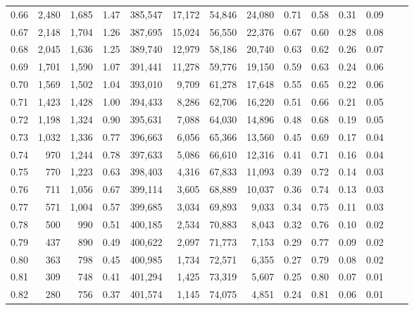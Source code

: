 \begin{tabular}{rrrrrrrrrrrrrr}
0.66 &   2,480 &  1,685 &    1.47 &  385,547 &   17,172 &  54,846 &  24,080 &  0.71 &  0.58 &  0.31 &      0.09 \\
0.67 &   2,148 &  1,704 &    1.26 &  387,695 &   15,024 &  56,550 &  22,376 &  0.67 &  0.60 &  0.28 &      0.08 \\
0.68 &   2,045 &  1,636 &    1.25 &  389,740 &   12,979 &  58,186 &  20,740 &  0.63 &  0.62 &  0.26 &      0.07 \\
0.69 &   1,701 &  1,590 &    1.07 &  391,441 &   11,278 &  59,776 &  19,150 &  0.59 &  0.63 &  0.24 &      0.06 \\
0.70 &   1,569 &  1,502 &    1.04 &  393,010 &    9,709 &  61,278 &  17,648 &  0.55 &  0.65 &  0.22 &      0.06 \\
0.71 &   1,423 &  1,428 &    1.00 &  394,433 &    8,286 &  62,706 &  16,220 &  0.51 &  0.66 &  0.21 &      0.05 \\
0.72 &   1,198 &  1,324 &    0.90 &  395,631 &    7,088 &  64,030 &  14,896 &  0.48 &  0.68 &  0.19 &      0.05 \\
0.73 &   1,032 &  1,336 &    0.77 &  396,663 &    6,056 &  65,366 &  13,560 &  0.45 &  0.69 &  0.17 &      0.04 \\
0.74 &     970 &  1,244 &    0.78 &  397,633 &    5,086 &  66,610 &  12,316 &  0.41 &  0.71 &  0.16 &      0.04 \\
0.75 &     770 &  1,223 &    0.63 &  398,403 &    4,316 &  67,833 &  11,093 &  0.39 &  0.72 &  0.14 &      0.03 \\
0.76 &     711 &  1,056 &    0.67 &  399,114 &    3,605 &  68,889 &  10,037 &  0.36 &  0.74 &  0.13 &      0.03 \\
0.77 &     571 &  1,004 &    0.57 &  399,685 &    3,034 &  69,893 &   9,033 &  0.34 &  0.75 &  0.11 &      0.03 \\
0.78 &     500 &    990 &    0.51 &  400,185 &    2,534 &  70,883 &   8,043 &  0.32 &  0.76 &  0.10 &      0.02 \\
0.79 &     437 &    890 &    0.49 &  400,622 &    2,097 &  71,773 &   7,153 &  0.29 &  0.77 &  0.09 &      0.02 \\
0.80 &     363 &    798 &    0.45 &  400,985 &    1,734 &  72,571 &   6,355 &  0.27 &  0.79 &  0.08 &      0.02 \\
0.81 &     309 &    748 &    0.41 &  401,294 &    1,425 &  73,319 &   5,607 &  0.25 &  0.80 &  0.07 &      0.01 \\
0.82 &     280 &    756 &    0.37 &  401,574 &    1,145 &  74,075 &   4,851 &  0.24 &  0.81 &  0.06 &      0.01 \\

\end{tabular}
